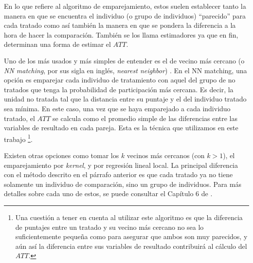 \documentclass[../../main.tex]{subfiles}
\begin{document}
En lo que refiere al algoritmo de emparejamiento, estos suelen establecer tanto la manera
en que se encuentra el individuo (o grupo de individuos) ``parecido'' para cada tratado
como así también la manera en que se pondera la diferencia a la hora de hacer la
comparación. También se los llama estimadores ya que en fin, determinan una forma de
estimar el \(ATT\).

Uno de los más usados y más simples de entender es el de vecino más cercano (o \textit{NN
matching}, por sus sigla en inglés, \textit{nearest neighbor}) \cite{bernal}. En el NN
matching, una opción es emparejar cada individuo de tratamiento con aquel del grupo de no
tratados que tenga la probabilidad de participación más cercana. Es decir, la unidad no
tratada tal que la distancia entre su puntaje y el del individuo tratado sea mínima. En
este caso, una vez que se haya emparejado a cada individuo tratado, el \(ATT\) se calcula
como el promedio simple de las diferencias entre las variables de resultado en cada
pareja. Esta es la técnica que utilizamos en este trabajo \footnote{Una cuestión a tener
en cuenta al utilizar este algoritmo es que la diferencia de puntajes entre un tratado y
su vecino más cercano no sea lo suficientemente pequeña como para asegurar que ambos son
muy parecidos, y aún así la diferencia entre sus variables de resultado contribuirá al
cálculo del \(ATT\).}.

Existen otras opciones como tomar los \(k\) vecinos más cercanos (con \(k > 1\)), el
emparejamiento por \textit{kernel}, y por regresión lineal local. La principal diferencia
con el método descrito en el párrafo anterior es que cada tratado ya no tiene solamente un
individuo de comparación, sino un grupo de individuos. Para más detalles sobre cada uno de
estos, se puede consultar el Capítulo 6 de \cite{bernal}.

\end{document}
